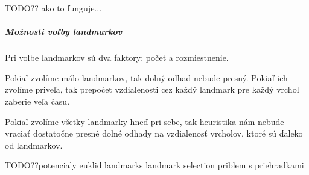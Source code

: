 TODO?? ako to funguje...

\subparagraph{Možnosti voľby landmarkov}

Pri voľbe landmarkov sú dva faktory: počet a rozmiestnenie.

\begin{example}
Pokiaľ zvolíme málo landmarkov, tak dolný odhad nebude presný.
Pokiaľ ich zvolíme priveľa, tak prepočet vzdialenosti cez každý landmark pre každý vrchol zaberie veľa času.
\end{example}

\begin{example}
Pokiaľ zvolíme všetky landmarky hneď pri sebe, tak heuristika
nám nebude vraciať dostatočne presné dolné odhady na vzdialenosť vrcholov, ktoré sú ďaleko od landmarkov.
\end{example}


TODO??potencialy euklid landmarks landmark selection priblem s priehradkami